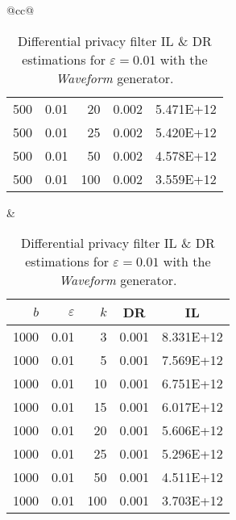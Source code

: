 \begin{table}[H]
\begin{tabular}{@{}cc@{}}
\begin{tabular}{@{}rrrrr@{}}
			500	&	0.01	&	20	&	0.002	&	5.471E+12 \\
			500	&	0.01	&	25	&	0.002	&	5.420E+12 \\
			500	&	0.01	&	50	&	0.002	&	4.578E+12 \\
			500	&	0.01	&	100	&	0.002	&	3.559E+12 \\
		\end{tabular}
		&
		\begin{tabular}{@{}rrrrr@{}}
			\toprule
			$b$ & $\varepsilon$ & $k$ & \multicolumn{1}{c}{DR} & \multicolumn{1}{c}{IL} \\ \midrule
			1000	&	0.01	&	3	&	0.001	&	8.331E+12 \\
			1000	&	0.01	&	5	&	0.001	&	7.569E+12 \\
			1000	&	0.01	&	10	&	0.001	&	6.751E+12 \\
			1000	&	0.01	&	15	&	0.001	&	6.017E+12 \\
			1000	&	0.01	&	20	&	0.001	&	5.606E+12 \\
			1000	&	0.01	&	25	&	0.001	&	5.296E+12 \\
			1000	&	0.01	&	50	&	0.001	&	4.511E+12 \\
			1000	&	0.01	&	100	&	0.001	&	3.703E+12 \\
		\end{tabular}
	\end{tabular}
	\caption[Differential privacy filter DR \& IL estimations (Waveform), $\varepsilon = 0.01$.]{Differential privacy filter IL \& DR estimations for $\varepsilon = 0.01$ with the \textit{Waveform} generator.}
\end{table}

